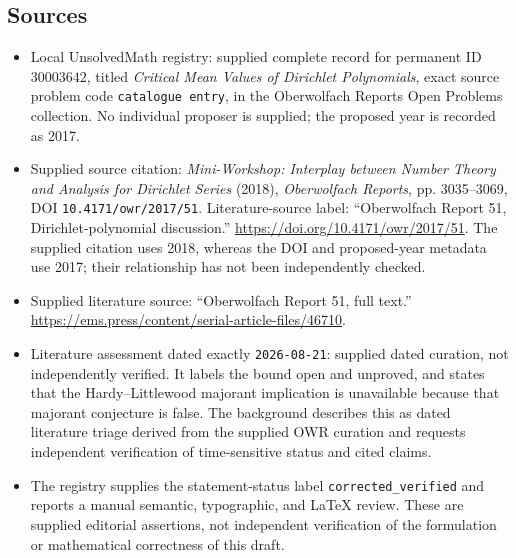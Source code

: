 \documentclass[11pt]{article}
\begin{document}
\subsection{Sources}
\begin{itemize}
\item Local UnsolvedMath registry: supplied complete record for permanent ID \(30003642\), titled \emph{Critical Mean Values of Dirichlet Polynomials}, exact source problem code \texttt{catalogue entry}, in the Oberwolfach Reports Open Problems collection. No individual proposer is supplied; the proposed year is recorded as 2017.
\item Supplied source citation: \emph{Mini-Workshop: Interplay between Number Theory and Analysis for Dirichlet Series} (2018), \emph{Oberwolfach Reports}, pp. 3035--3069, DOI \texttt{10.4171/owr/2017/51}. Literature-source label: ``Oberwolfach Report 51, Dirichlet-polynomial discussion.'' \url{https://doi.org/10.4171/owr/2017/51}. The supplied citation uses 2018, whereas the DOI and proposed-year metadata use 2017; their relationship has not been independently checked.
\item Supplied literature source: ``Oberwolfach Report 51, full text.'' \url{https://ems.press/content/serial-article-files/46710}.
\item Literature assessment dated exactly \texttt{2026-08-21}: supplied dated curation, not independently verified. It labels the bound open and unproved, and states that the Hardy--Littlewood majorant implication is unavailable because that majorant conjecture is false. The background describes this as dated literature triage derived from the supplied OWR curation and requests independent verification of time-sensitive status and cited claims.
\item The registry supplies the statement-status label \texttt{corrected\_verified} and reports a manual semantic, typographic, and LaTeX review. These are supplied editorial assertions, not independent verification of the formulation or mathematical correctness of this draft.
\end{itemize}
\end{document}

